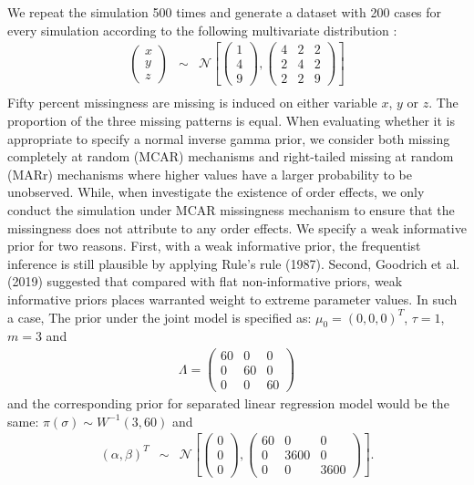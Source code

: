 \documentclass[12pt, fullpage, a4paper]{article}
\begin{document}
We repeat the simulation 500 times and generate a dataset with 200 cases for every simulation according to the following multivariate distribution :
\begin{eqnarray*}
	\begin{pmatrix}x\\
		y\\
		z
	\end{pmatrix} & \sim & \mathcal{N}\left[\left(\begin{array}{c}
		1\\
		4\\
		9
	\end{array}\right),\left(\begin{array}{ccc}
		4 & 2 & 2\\
		2 & 4 & 2\\
		2 & 2 & 9 
	\end{array}\right)\right]\\
\end{eqnarray*}
Fifty percent missingness are missing is induced on either variable $x$, $y$ or $z$. The proportion of the three missing patterns is equal. When evaluating whether it is appropriate to specify a normal inverse gamma prior, we consider both missing completely at random (MCAR) mechanisms and right-tailed missing at random (MARr) mechanisms where higher values have a larger probability to be unobserved. While, when investigate the existence of order effects, we only conduct the simulation under MCAR missingness mechanism to ensure that the missingness does not attribute to any order effects. We specify a weak informative prior for two reasons. First, with a weak informative prior, the frequentist inference is still plausible by applying Rule's rule (1987). Second, Goodrich et al. (2019)\nocite{Goodrich2019} suggested that compared with flat non-informative priors, weak informative priors places warranted weight to extreme parameter values. In such a case, The prior under the joint model is specified as: $\mu_{0} = (0, 0, 0)^T$, $\tau = 1$, $m = 3$ and 
\begin{eqnarray*}
	\Lambda = \left(\begin{array}{ccc}
		60 & 0 & 0\\
		0 & 60 & 0\\
		0 & 0 & 60 
	\end{array}\right)
\end{eqnarray*}
and the corresponding prior for separated linear regression model would be the same: $\pi(\sigma) \sim W^{-1}(3, 60)$ and 
\begin{eqnarray*}
	(\alpha, \beta)^T
	 & \sim & \mathcal{N}\left[\left(\begin{array}{c}
		0\\
		0\\
		0
	\end{array}\right),\left(\begin{array}{ccc}
		60 & 0 & 0\\
		0 & 3600 & 0\\
		0 & 0 & 3600 
	\end{array}\right)\right].\\
\end{eqnarray*}
\end{document}
